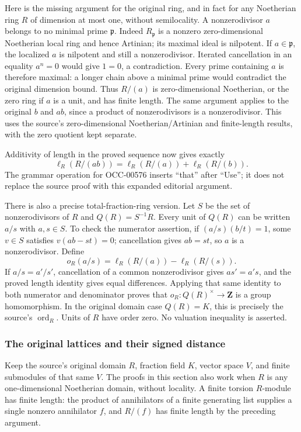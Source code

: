 Here is the missing argument for the original ring, and in fact for any Noetherian ring \(R\) of dimension at most one, without semilocality. A nonzerodivisor \(a\) belongs to no minimal prime \(\mathfrak p\). Indeed \(R_{\mathfrak p}\) is a nonzero zero-dimensional Noetherian local ring and hence Artinian; its maximal ideal is nilpotent. If \(a\in\mathfrak p\), the localized \(a\) is nilpotent and still a nonzerodivisor. Iterated cancellation in an equality \(a^n=0\) would give \(1=0\), a contradiction. Every prime containing \(a\) is therefore maximal: a longer chain above a minimal prime would contradict the original dimension bound. Thus \(R/(a)\) is zero-dimensional Noetherian, or the zero ring if \(a\) is a unit, and has finite length. The same argument applies to the original \(b\) and \(ab\), since a product of nonzerodivisors is a nonzerodivisor. This uses the source's zero-dimensional Noetherian/Artinian and finite-length results, with the zero quotient kept separate.

Additivity of length in the proved sequence now gives exactly \[
 \ell_R(R/(ab))=\ell_R(R/(a))+\ell_R(R/(b)).
\] The grammar operation for OCC-00576 inserts ``that'' after ``Use''; it does not replace the source proof with this expanded editorial argument.

There is also a precise total-fraction-ring version. Let \(S\) be the set of nonzerodivisors of \(R\) and \(Q(R)=S^{-1}R\). Every unit of \(Q(R)\) can be written \(a/s\) with \(a,s\in S\). To check the numerator assertion, if \((a/s)(b/t)=1\), some \(v\in S\) satisfies \(v(ab-st)=0\); cancellation gives \(ab=st\), so \(a\) is a nonzerodivisor. Define \[
 o_R(a/s)=\ell_R(R/(a))-\ell_R(R/(s)).
\] If \(a/s=a'/s'\), cancellation of a common nonzerodivisor gives \(as'=a's\), and the proved length identity gives equal differences. Applying that same identity to both numerator and denominator proves that \(o_R:Q(R)^\times\to\mathbf Z\) is a group homomorphism. In the original domain case \(Q(R)=K\), this is precisely the source's \(\operatorname{ord}_R\). Units of \(R\) have order zero. No valuation inequality is asserted.

\subsubsection{The original lattices and their signed distance}\label{the-original-lattices-and-their-signed-distance}

Keep the source's original domain \(R\), fraction field \(K\), vector space \(V\), and finite submodules of that same \(V\). The proofs in this section also work when \(R\) is any one-dimensional Noetherian domain, without locality. A finite torsion \(R\)-module has finite length: the product of annihilators of a finite generating list supplies a single nonzero annihilator \(f\), and \(R/(f)\) has finite length by the preceding argument.

